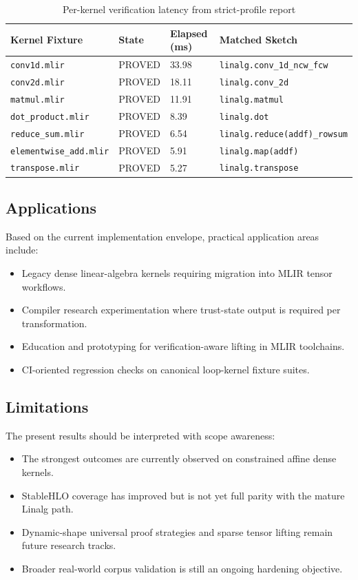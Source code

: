 \begin{table}[H]
\centering
\caption{Per-kernel verification latency from strict-profile report}
\begin{tabular}{|p{4.0cm}|p{3.0cm}|p{3.0cm}|p{4.5cm}|}
\hline
\textbf{Kernel Fixture} & \textbf{State} & \textbf{Elapsed (ms)} & \textbf{Matched Sketch} \\
\hline
\texttt{conv1d.mlir} & PROVED & 33.98 & \texttt{linalg.conv\_1d\_ncw\_fcw} \\
\hline
\texttt{conv2d.mlir} & PROVED & 18.11 & \texttt{linalg.conv\_2d} \\
\hline
\texttt{matmul.mlir} & PROVED & 11.91 & \texttt{linalg.matmul} \\
\hline
\texttt{dot\_product.mlir} & PROVED & 8.39 & \texttt{linalg.dot} \\
\hline
\texttt{reduce\_sum.mlir} & PROVED & 6.54 & \texttt{linalg.reduce(addf)\_rowsum} \\
\hline
\texttt{elementwise\_add.mlir} & PROVED & 5.91 & \texttt{linalg.map(addf)} \\
\hline
\texttt{transpose.mlir} & PROVED & 5.27 & \texttt{linalg.transpose} \\
\hline
\end{tabular}
\end{table}

\subsection{Applications}
Based on the current implementation envelope, practical application areas include:
\begin{itemize}
\item Legacy dense linear-algebra kernels requiring migration into MLIR tensor workflows.
\item Compiler research experimentation where trust-state output is required per transformation.
\item Education and prototyping for verification-aware lifting in MLIR toolchains.
\item CI-oriented regression checks on canonical loop-kernel fixture suites.
\end{itemize}

\subsection{Limitations}
The present results should be interpreted with scope awareness:
\begin{itemize}
\item The strongest outcomes are currently observed on constrained affine dense kernels.
\item StableHLO coverage has improved but is not yet full parity with the mature Linalg path.
\item Dynamic-shape universal proof strategies and sparse tensor lifting remain future research tracks.
\item Broader real-world corpus validation is still an ongoing hardening objective.
\end{itemize}
